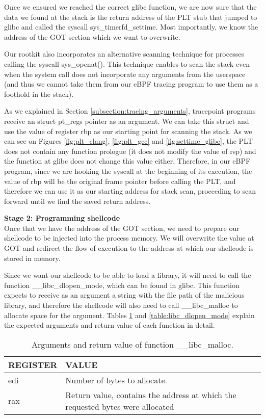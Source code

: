 Once we ensured we reached the correct glibc function, we are now sure that the data we found at the stack is the return address of the PLT stub that jumped to glibc and called the syscall sys\_timerfd\_settime. Most importantly, we know the address of the GOT section which we want to overwrite.

Our rootkit also incorporates an alternative scanning technique for processes calling the syscall sys\_openat(). This technique enables to scan the stack even when the system call does not incorporate any arguments from the userspace (and thus we cannot take them from our eBPF tracing program to use them as a foothold in the stack).

As we explained in Section \ref{subsection:tracing_arguments}, tracepoint programs receive an struct pt\_regs pointer as an argument. We can take this struct and use the value of register rbp as our starting point for scanning the stack. As we can see on Figures \ref{fig:plt_clang}, \ref{fig:plt_gcc} and \ref{fig:settime_glibc}, the  PLT does not contain any function prologue (it does not modify the value of rsp) and the function at glibc does not change this value either. Therefore, in our eBPF program, since we are hooking the syscall at the beginning of its execution, the value of rbp will be the original frame pointer before calling the PLT, and therefore we can use it as our starting address for stack scan, proceeding to scan forward until we find the saved return address.

\textbf{Stage 2: Programming shellcode}\\
Once that we have the address of the GOT section, we need to prepare our shellcode to be injected into the process memory. We will overwrite the value at GOT and redirect the flow of execution to the address at which our shellcode is stored in memory. 

Since we want our shellcode to be able to load a library, it will need to call the function \_\_libc\_dlopen\_mode, which can be found in glibc. This function expects to receive as an argument a string with the file path of the malicious library, and therefore the shellcode will also need to call \_\_libc\_malloc to allocate space for the argument. Tables \ref{table:libc_malloc} and \ref{table:libc_dlopen_mode} explain the expected arguments and return value of each function in detail.

\begin{table}[htbp]
\begin{tabular}{|>{\centering\arraybackslash}p{3cm}|>{\centering\arraybackslash}p{10cm}|}
\hline
\textbf{REGISTER} & \textbf{VALUE}\\
\hline
\hline
edi & Number of bytes to allocate. \\
\hline
rax & Return value, contains the address at which the requested bytes were allocated\\
\hline
\end{tabular}
\caption{Arguments and return value of function \_\_libc\_malloc.}
\label{table:libc_malloc}
\end{table}

